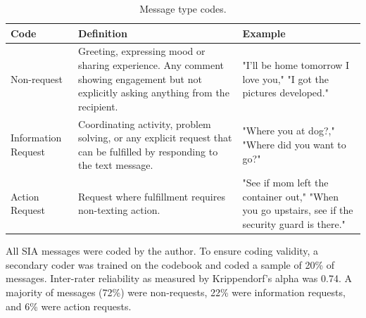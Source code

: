 \documentclass[12pt]{nuthesis}	%
\begin{document}
\begin{table}[]
\centering

\begin{tabular}{lp{6cm}p{5cm}}
\hline
Code                & Definition                                                                                                                             & Example                                                                                          \\ \hline
Non-request         & Greeting, expressing mood or sharing experience. Any comment showing engagement but not explicitly asking anything from the recipient. & "I’ll be home tomorrow I love you," "I got the pictures developed."                              \\
Information Request & Coordinating activity, problem solving, or any explicit request that can be fulfilled by responding to the text message.               & "Where you at dog?," "Where did you want to go?"                                                 \\
Action Request      & Request where fulfillment requires non-texting action.                                                                                 & "See if mom left the container out," "When you go upstairs, see if the security guard is there." \\ \hline
\end{tabular}
\caption{Message type codes.}
\label{tab:codes}
\end{table}

All SIA messages were coded by the author. To ensure coding validity, a secondary coder was trained on the codebook and coded a sample of 20\% of messages. Inter-rater reliability as measured by Krippendorf's alpha was 0.74. A majority of messages (72\%) were non-requests, 22\% were information requests, and 6\% were action requests.


\end{document}
